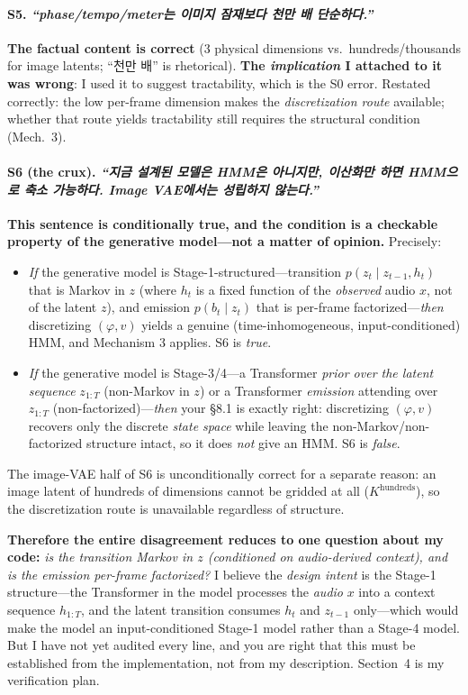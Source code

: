 \documentclass[11pt]{article}
\newcommand{\korean}[1]{\textit{#1}}
\begin{document}
\paragraph{S5. \korean{``phase/tempo/meter는 이미지 잠재보다 천만 배 단순하다.''}}
\textbf{The factual content is correct} (3 physical dimensions vs.\ hundreds/thousands for image
latents; ``천만 배'' is rhetorical). \textbf{The \emph{implication} I attached to it was wrong}: I
used it to suggest tractability, which is the S0 error. Restated correctly: the low per-frame
dimension makes the \emph{discretization route} available; whether that route yields tractability
still requires the structural condition (Mech.~3).

\paragraph{S6 (the crux). \korean{``지금 설계된 모델은 HMM은 아니지만, 이산화만 하면 HMM으로
축소 가능하다. Image VAE에서는 성립하지 않는다.''}}
\textbf{This sentence is conditionally true, and the condition is a checkable property of the
generative model---not a matter of opinion.} Precisely:
\begin{itemize}[leftmargin=1.4em]
\item \emph{If} the generative model is Stage-1-structured---transition
$p(z_t\mid z_{t-1}, h_t)$ that is Markov in $z$ (where $h_t$ is a fixed function of the
\emph{observed} audio $x$, not of the latent $z$), and emission $p(b_t\mid z_t)$ that is per-frame
factorized---\emph{then} discretizing $(\varphi,v)$ yields a genuine (time-inhomogeneous,
input-conditioned) HMM, and Mechanism 3 applies. S6 is \emph{true}.
\item \emph{If} the generative model is Stage-3/4---a Transformer \emph{prior over the latent
sequence} $z_{1:T}$ (non-Markov in $z$) or a Transformer \emph{emission} attending over $z_{1:T}$
(non-factorized)---\emph{then} your \S8.1 is exactly right: discretizing $(\varphi,v)$ recovers only
the discrete \emph{state space} while leaving the non-Markov/non-factorized structure intact, so it
does \emph{not} give an HMM. S6 is \emph{false}.
\end{itemize}
The image-VAE half of S6 is unconditionally correct for a separate reason: an image latent of
hundreds of dimensions cannot be gridded at all ($K^{\text{hundreds}}$), so the discretization route
is unavailable regardless of structure.

\medskip
\noindent\textbf{Therefore the entire disagreement reduces to one question about my code:}
\emph{is the transition Markov in $z$ (conditioned on audio-derived context), and is the emission
per-frame factorized?} I believe the \emph{design intent} is the Stage-1 structure---the Transformer
in the model processes the \emph{audio} $x$ into a context sequence $h_{1:T}$, and the latent
transition consumes $h_t$ and $z_{t-1}$ only---which would make the model an input-conditioned
Stage-1 model rather than a Stage-4 model. But I have not yet audited every line, and you are right
that this must be established from the implementation, not from my description. Section~4 is my
verification plan.
\end{document}

